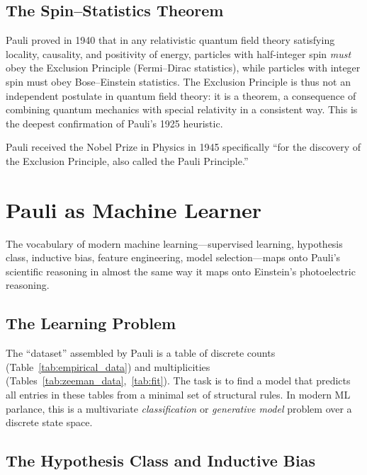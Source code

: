 \documentclass[12pt]{article}
\begin{document}
\subsection{The Spin--Statistics Theorem}

Pauli proved in 1940 \citep{Pauli1940} that in any relativistic quantum field
theory satisfying locality, causality, and positivity of energy, particles with
half-integer spin \emph{must} obey the Exclusion Principle (Fermi--Dirac
statistics), while particles with integer spin must obey Bose--Einstein
statistics.  The Exclusion Principle is thus not an independent postulate in quantum
field theory: it is a theorem, a consequence of combining quantum mechanics
with special relativity in a consistent way.  This is the deepest confirmation
of Pauli's 1925 heuristic.

Pauli received the Nobel Prize in Physics in 1945 specifically ``for the
discovery of the Exclusion Principle, also called the Pauli Principle.''

\section{Pauli as Machine Learner}
\label{sec:ml}

The vocabulary of modern machine learning---supervised learning, hypothesis
class, inductive bias, feature engineering, model selection---maps onto
Pauli's scientific reasoning in almost the same way it maps onto Einstein's
photoelectric reasoning.

\subsection{The Learning Problem}

The ``dataset'' assembled by Pauli is a table of discrete counts
(Table~\ref{tab:empirical_data}) and multiplicities
(Tables~\ref{tab:zeeman_data},~\ref{tab:fit}).  The task is to find a
model that predicts all entries in these tables from a minimal set of
structural rules.  In modern ML parlance, this is a multivariate
\emph{classification} or \emph{generative model} problem over a discrete
state space.

\subsection{The Hypothesis Class and Inductive Bias}
\end{document}
